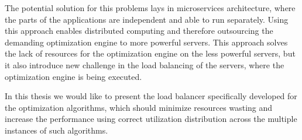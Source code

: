 The potential solution for this problems lays in microservices architecture,
where the parts of the applications are independent and able to run separately.
Using this approach enables distributed computing
and therefore outsourcing the demanding optimization engine to more powerful servers.
This approach solves the lack of resources for the optimization engine on the less powerful servers,
but it also introduce new challenge in the load balancing of the servers,
where the optimization engine is being executed.

In this thesis we would like to present the load balancer specifically developed for the optimization algorithms,
which should minimize resources wasting 
and increase the performance using correct utilization distribution across the multiple instances of such algorithms.



